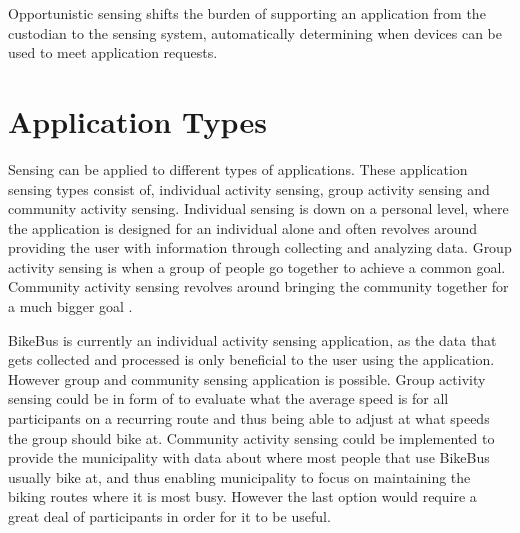 \begin{defi}
Opportunistic sensing shifts the burden of supporting an application from the custodian to the sensing system, automatically determining when devices can be used to meet application requests. \cite{Lane:2008:USS:1411759.1411763} 
\end{defi}



\section{Application Types}
\label{section:Mobile_Sensing_Application_Types}

Sensing can be applied to different types of applications. These application sensing types consist of, individual activity sensing, group activity sensing and community activity sensing. Individual sensing is down on a personal level, where the application is designed for an individual alone and often revolves around providing the user with information through collecting and analyzing data. Group activity sensing is when a group of people go together to achieve a common goal. Community activity sensing revolves around bringing the community together for a much bigger goal \cite{Lane:2010:SMP:1866991.1867010}.

BikeBus is currently an individual activity sensing application, as the data that gets collected and processed is only beneficial to the user using the application. However group and community sensing application is possible. Group activity sensing could be in form of to evaluate what the average speed is for all participants on a recurring route and thus being able to adjust at what speeds the group should bike at. Community activity sensing could be implemented to provide the municipality with data about where most people that use BikeBus usually bike at, and thus enabling municipality to focus on maintaining the biking routes where it is most busy. However the last option would require a great deal of participants in order for it to be useful. 

